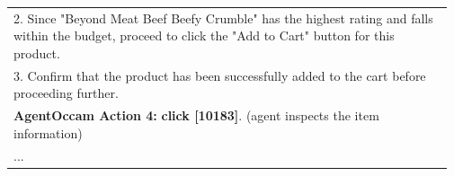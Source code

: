 \begin{table}[H]
\begin{tabularx}{\linewidth}{p{0.97\linewidth}}
2. Since "Beyond Meat Beef Beefy Crumble" has the highest rating and falls within the budget, proceed to click the "Add to Cart" button for this product.\\
3. Confirm that the product has been successfully added to the cart before proceeding further.\\
\midrule
\textbf{AgentOccam Action 4:}
\textbf{click [10183]}. (agent inspects the item information)\\
\midrule
...\\
\bottomrule
\end{tabularx}
\end{table}

